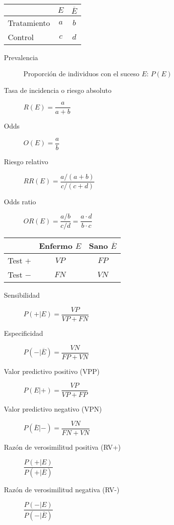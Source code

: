 \begin{multicols*}{2}
\begin{tcolorbox}[hbox, title=Riesgos]
\begin{minipage}{0.4\textwidth}
\begin{center}
\begin{tabular}{|l|c|c|}
\cline{2-3}
\multicolumn{1}{c|}{} & $E$ & $\overline E$ \\
\hline
Tratamiento           & $a$ & $b$           \\
\hline
Control               & $c$ & $d$           \\
\hline
\end{tabular}
\end{center}
\begin{description}
\item[Prevalencia] Proporción de individuos con el suceso $E$: $P(E)$
\item[Tasa de incidencia o riesgo absoluto] $R(E)=\dfrac{a}{a+b}$
\item[Odds] $O(E)=\dfrac{a}{b}$
\item[Riesgo relativo] $RR(E)=\dfrac{a/(a+b)}{c/(c+d)}$
\item[Odds ratio] $OR(E)=\dfrac{a/b}{c/d}=\dfrac{a\cdot d}{b\cdot c}$
\end{description}
\end{minipage}
\end{tcolorbox}


\begin{tcolorbox}[hbox, title=Test diagnósticos]
\begin{minipage}{0.4\textwidth}
\begin{center}
\begin{tabular}{|l|c|c|}
\cline{2-3}
\multicolumn{1}{c|}{} & Enfermo $E$ & Sano $\overline E$ \\
\hline
Test $+$              & $VP$    & $FP$ \\
\hline
Test $-$              & $FN$    & $VN$ \\
\hline
\end{tabular}
\end{center}
\begin{description}
\item[Sensibilidad] $P(+|E)=\dfrac{VP}{VP+FN}$
\item[Especificidad] $P(-|\overline{E})=\dfrac{VN}{FP+VN}$
\item[Valor predictivo positivo (VPP)] $P(E|+)=\dfrac{VP}{VP+FP}$
\item[Valor predictivo negativo (VPN)] $P(\overline{E}|-)=\dfrac{VN}{FN+VN}$
\item[Razón de verosimilitud positiva (RV+)] $\dfrac{P(+|E)}{P(+|\overline{E})}$
\item[Razón de verosimilitud negativa (RV-)] $\dfrac{P(-|E)}{P(-|\overline{E})}$
\end{description}
\end{minipage}
\end{tcolorbox}



\end{multicols*}
